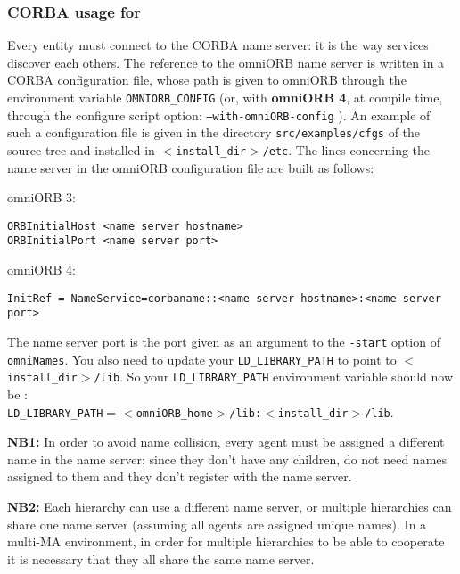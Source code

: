 \subsubsection{CORBA usage for \diet}

Every \diet entity must connect to the CORBA name server:
it is the way services discover each others. The reference to the
omniORB name server is written in a CORBA configuration file, whose path
is given to omniORB through the environment variable
\texttt{OMNIORB\_CONFIG} (or, with \textbf{omniORB 4}, at compile
time, through the configure script option:
\texttt{--with-omniORB-config} ). An example of such a
configuration file is given in the directory
\texttt{src/examples/cfgs} of the \diet source tree and installed in
\texttt{$<$install\_dir$>$/etc}. The lines concerning the name server
in the omniORB configuration file are built as follows:
\begin{description}
 \item{omniORB 3:}
{\footnotesize
\begin{verbatim}
ORBInitialHost <name server hostname>
ORBInitialPort <name server port>
\end{verbatim}
}
 \item{omniORB 4:}
{\footnotesize
\begin{verbatim}
InitRef = NameService=corbaname::<name server hostname>:<name server
port>
\end{verbatim}
} 
\end{description}
The name server port is the port given as an argument to the
\texttt{-start} option of \texttt{omniNames}.  You also need to update
your \texttt{LD\_LIBRARY\_PATH} to point to
\texttt{$<$install\_dir$>$/lib}.  So your \texttt{LD\_LIBRARY\_PATH}
environment variable should now be :\\ \texttt{LD\_LIBRARY\_PATH$=
<$omniORB\_home$>$/lib:$<$install\_dir$>$/lib}.

\textbf{NB1:} In order to avoid name collision, every agent must be 
assigned a different name in the name server; since they don't have any 
children, \seds do not need names assigned to them and they don't register with
the name server.

\textbf{NB2:} Each \diet hierarchy can use a different name server, or multiple 
hierarchies can share one name server (assuming all agents are assigned 
unique names).  In a multi-MA environment, in order for multiple hierarchies
to be able to cooperate it is necessary that they all share the same
name server.

